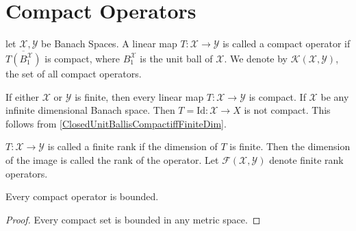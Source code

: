 \section{Compact Operators}
\begin{definition}
  let $\mathcal{X}, \mathcal{Y}$ be Banach Spaces. A linear map $T : \mathcal{
  X} \to \mathcal{Y}$ is called a
  compact operator if $\overline{T(B_1^\mathcal{X})}$ is compact,
  where $B_1^\mathcal{X}$
  is the unit ball of $\mathcal{X}$. We denote by
  $\mathcal{K}(\mathcal{X}, \mathcal{Y})$, the set of all
  compact operators.
\end{definition}

\begin{example}
  If either $\mathcal{X}$ or $\mathcal{Y}$ is finite, then every linear map $T:
  \mathcal{X} \to \mathcal{Y}$
  is compact. If $\mathcal{X}$ be any infinite dimensional Banach space. Then
  $T = \textrm{Id} : \mathcal{X} \to X$ is not compact. This follows from
  \autoref{ClosedUnitBallisCompactiffFiniteDim}.
\end{example}

\begin{definition}
  $T: \mathcal{X} \to \mathcal{Y}$ is called a finite rank if the
  dimension of $T$ is
  finite. Then the dimension of the image is called the rank of the
  operator. Let $\mathcal{F}(\mathcal{X}, \mathcal{Y})$ denote finite
  rank operators.
\end{definition}

\begin{lemma}
  Every compact operator is bounded.
\end{lemma}
\begin{proof}
  Every compact set is bounded in any metric space.
\end{proof}

